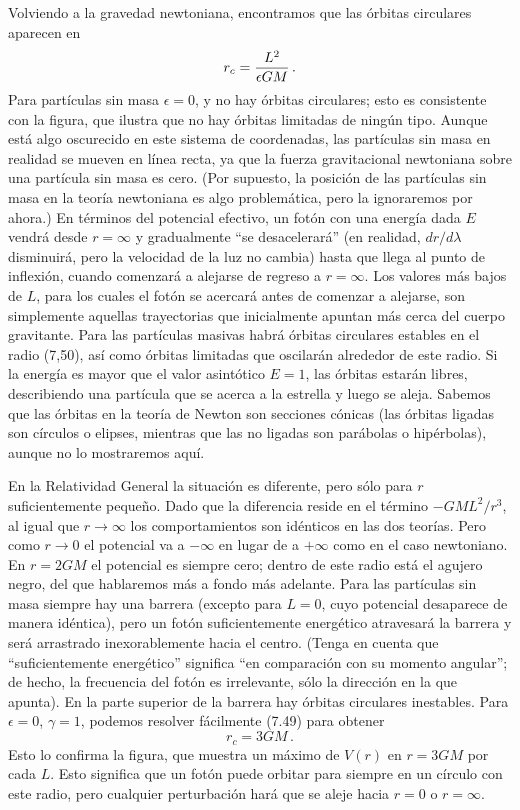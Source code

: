 \documentclass[11pt,b5paper,openany,twoside]{book}
\begin{document}
Volviendo a la gravedad newtoniana, encontramos que las órbitas circulares aparecen en
\begin{equation}
r_c = {{L^2}\over{\epsilon GM}}\,.\label{7.50}
\end{equation}
Para partículas sin masa $\epsilon=0$, y no hay órbitas circulares; esto es consistente con la figura, que ilustra que no hay órbitas limitadas de ningún tipo.
Aunque está algo oscurecido en este sistema de coordenadas, las partículas sin masa en realidad se mueven en línea recta, ya que la fuerza gravitacional newtoniana sobre una partícula sin masa es cero.
(Por supuesto, la posición de las partículas sin masa en la teoría newtoniana es algo problemática, pero la ignoraremos por ahora.)
En términos del potencial efectivo, un fotón con una energía dada $E$ vendrá desde $r=\infty$ y gradualmente ``se desacelerará'' (en realidad, $dr/d\lambda$ disminuirá, pero la velocidad de la luz no cambia) hasta que llega al punto de inflexión, cuando comenzará a alejarse de regreso a $r=\infty$.
Los valores más bajos de $L$, para los cuales el fotón se acercará antes de comenzar a alejarse, son simplemente aquellas trayectorias que inicialmente apuntan más cerca del cuerpo gravitante.
Para las partículas masivas habrá órbitas circulares estables en el radio (7,50), así como órbitas limitadas que oscilarán alrededor de este radio.
Si la energía es mayor que el valor asintótico $E=1$, las órbitas estarán libres, describiendo una partícula que se acerca a la estrella y luego se aleja.
Sabemos que las órbitas en la teoría de Newton son secciones cónicas (las órbitas ligadas son círculos o elipses, mientras que las no ligadas son parábolas o hipérbolas), aunque no lo mostraremos aquí.

En la Relatividad General la situación es diferente, pero sólo para $r$ suficientemente pequeño.
Dado que la diferencia reside en el término $-GML^2/r^3$, al igual que $r\rightarrow\infty$ los comportamientos son idénticos en las dos teorías.
Pero como $r\rightarrow 0$ el potencial va a $-\infty$ en lugar de a $+\infty$ como en el caso newtoniano.
En $r=2GM$ el potencial es siempre cero; dentro de este radio está el agujero negro, del que hablaremos más a fondo más adelante.
Para las partículas sin masa siempre hay una barrera (excepto para $L=0$, cuyo potencial desaparece de manera idéntica), pero un fotón suficientemente energético atravesará la barrera y será arrastrado inexorablemente hacia el centro.
(Tenga en cuenta que ``suficientemente energético'' significa ``en comparación con su momento angular''; de hecho, la frecuencia del fotón es irrelevante, sólo la dirección en la que apunta).
En la parte superior de la barrera hay órbitas circulares inestables.
Para $\epsilon=0$, $\gamma=1$, podemos resolver fácilmente (7.49) para obtener
\begin{equation}
r_c = 3GM\,.\label{7.51}
\end{equation}
Esto lo confirma la figura, que muestra un máximo de $V(r)$ en $r=3GM$ por cada $L$.
Esto significa que un fotón puede orbitar para siempre en un círculo con este radio, pero cualquier perturbación hará que se aleje hacia $r=0$ o $r=\infty$.
\end{document}
